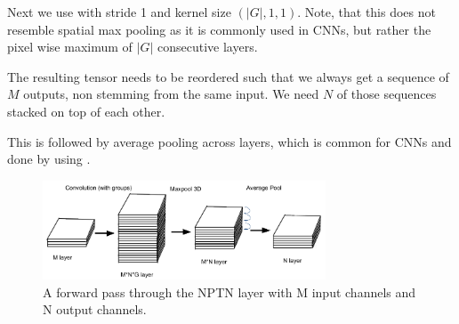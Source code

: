 \documentclass{llncs}
\begin{document}

Next we use \nnMaxPool with stride 1 and kernel size $(|G|,1,1)$. Note, that this does not resemble spatial max pooling as it is commonly used in CNNs, but rather the pixel wise maximum of $|G|$ consecutive layers.

The resulting tensor needs to be reordered such that we always get a sequence of $M$ outputs, non stemming from the same input. We need $N$ of those sequences stacked on top of each other.

This is followed by average pooling across layers, which is common for CNNs and done by using \nnAvgPool.

\begin{figure}
	\begin{center}
		\includegraphics[width=0.75\textwidth]{result_images/NptnImplementation.png}
		\caption{A forward pass through the NPTN layer with M input channels and N output channels.}
		\label{fig:NptnImplementation}
	\end{center}
\end{figure}
\end{document}

